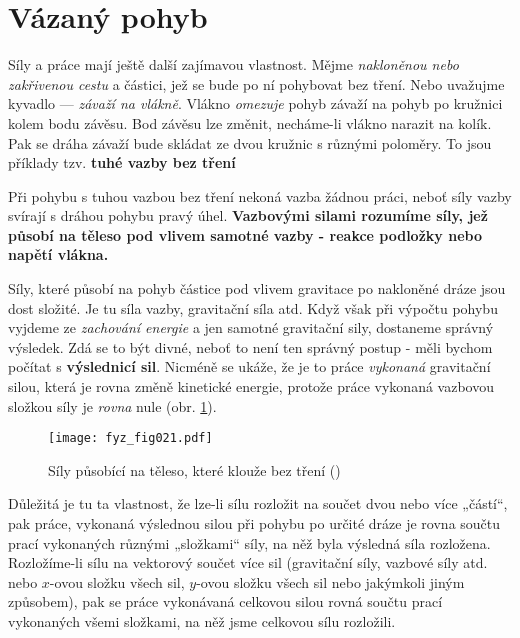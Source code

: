   \section{Vázaný pohyb}
    Síly a práce mají ještě další zajímavou vlastnost. Mějme \emph{nakloněnou nebo zakřivenou 
    cestu} a částici, jež se bude po ní pohybovat bez tření. Nebo uvažujme kyvadlo — \emph{závaží 
    na vlákně}. Vlákno \emph{omezuje} pohyb závaží na pohyb po kružnici kolem bodu závěsu. Bod 
    závěsu lze změnit, necháme-li vlákno narazit na kolík. Pak se dráha závaží bude skládat ze dvou 
    kružnic s různými poloměry. To jsou příklady tzv. \textbf{tuhé vazby bez tření}
    
    Při pohybu s tuhou vazbou bez tření nekoná vazba žádnou práci, neboť síly vazby svírají s 
    dráhou pohybu pravý úhel. \textbf{Vazbovými silami rozumíme síly, jež působí na těleso pod 
    vlivem samotné vazby - reakce podložky nebo napětí vlákna.}
    
    Síly, které působí na pohyb částice pod vlivem gravitace po nakloněné dráze jsou dost složité. 
    Je tu síla vazby, gravitační síla atd. Když však při výpočtu pohybu vyjdeme ze \emph{zachování 
    energie} a jen samotné gravitační sily, dostaneme správný výsledek. Zdá se to být divné, neboť 
    to není ten správný postup - měli bychom počítat s \textbf{výslednicí sil}. Nicméně se ukáže, 
    že je to práce \emph{vykonaná} gravitační silou, která je rovna změně kinetické energie, 
    protože práce vykonaná vazbovou složkou síly je \emph{rovna} nule (obr. \ref{fyz:fig021}).
  
    \begin{figure}[ht!]  %
      \centering
      \texttt{[image: fyz\_fig021.pdf]}
      \caption{Síly působící na těleso, které klouže bez tření (\cite[s.~201]{Feynman01})}
      \label{fyz:fig021}
    \end{figure}
    Důležitá je tu ta vlastnost, že lze-li sílu rozložit na součet dvou nebo více „částí“, pak 
    práce, vykonaná výslednou silou při pohybu po určité dráze je rovna součtu prací vykonaných 
    různými „složkami“ síly, na něž byla výsledná síla rozložena. Rozložíme-li sílu na vektorový 
    součet více sil (gravitační síly, vazbové síly atd. nebo \(x\)-ovou složku všech sil, 
    \(y\)-ovou složku všech sil nebo jakýmkoli jiným způsobem), pak se práce vykonávaná celkovou 
    silou rovná součtu prací vykonaných všemi složkami, na něž jsme celkovou sílu rozložili.
  
